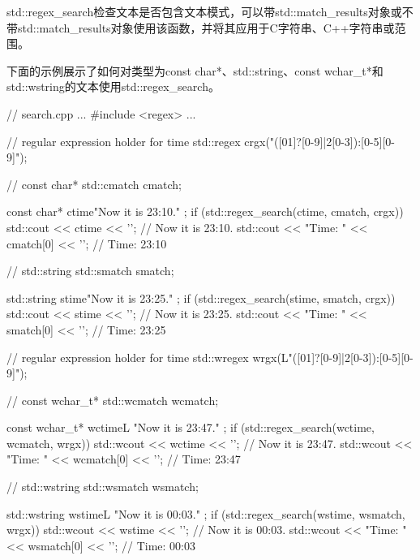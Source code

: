 
std::regex\_search检查文本是否包含文本模式，可以带std::match\_results对象或不带std::match\_results对象使用该函数，并将其应用于C字符串、C++字符串或范围。

下面的示例展示了如何对类型为const char*、std::string、const wchar\_t*和std::wstring的文本使用std::regex\_search。


\begin{cpp}
// search.cpp
...
#include <regex>
...

// regular expression holder for time
std::regex crgx("([01]?[0-9]|2[0-3]):[0-5][0-9]");

// const char*
std::cmatch cmatch;

const char* ctime{"Now it is 23:10." };
if (std::regex_search(ctime, cmatch, crgx)){
	std::cout << ctime << '\n'; // Now it is 23:10.
	std::cout << "Time: " << cmatch[0] << '\n'; // Time: 23:10
}

// std::string
std::smatch smatch;

std::string stime{"Now it is 23:25." };
if (std::regex_search(stime, smatch, crgx)){
	std::cout << stime << '\n'; // Now it is 23:25.
	std::cout << "Time: " << smatch[0] << '\n'; // Time: 23:25
}

// regular expression holder for time
std::wregex wrgx(L"([01]?[0-9]|2[0-3]):[0-5][0-9]");

// const wchar_t*
std::wcmatch wcmatch;

const wchar_t* wctime{L "Now it is 23:47." };
if (std::regex_search(wctime, wcmatch, wrgx)){
	std::wcout << wctime << '\n'; // Now it is 23:47.
	std::wcout << "Time: " << wcmatch[0] << '\n'; // Time: 23:47
}

// std::wstring
std::wsmatch wsmatch;

std::wstring wstime{L "Now it is 00:03." };
if (std::regex_search(wstime, wsmatch, wrgx)){
	std::wcout << wstime << '\n'; // Now it is 00:03.
	std::wcout << "Time: " << wsmatch[0] << '\n'; // Time: 00:03
}
\end{cpp}






































